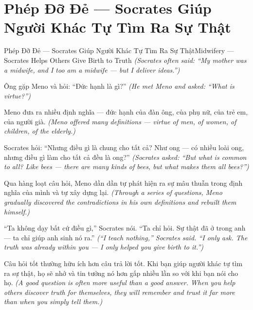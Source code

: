 \section{Phép Đỡ Đẻ — Socrates Giúp Người Khác Tự Tìm Ra Sự Thật}
\begin{truyen}{Phép Đỡ Đẻ — Socrates Giúp Người Khác Tự Tìm Ra Sự Thật}{Midwifery — Socrates Helps Others Give Birth to Truth}
\textit{(Socrates often said: ``My mother was a midwife, and I too am a midwife — but I deliver ideas.'')}

Ông gặp Meno và hỏi: ``Đức hạnh là gì?''
\textit{(He met Meno and asked: ``What is virtue?'')}

Meno đưa ra nhiều định nghĩa — đức hạnh của đàn ông, của phụ nữ, của trẻ em, của người già.
\textit{(Meno offered many definitions — virtue of men, of women, of children, of the elderly.)}

Socrates hỏi: ``Nhưng điều gì là chung cho tất cả? Như ong — có nhiều loài ong, nhưng điều gì làm cho tất cả đều là ong?''
\textit{(Socrates asked: ``But what is common to all? Like bees — there are many kinds of bees, but what makes them all bees?'')}

Qua hàng loạt câu hỏi, Meno dần dần tự phát hiện ra sự mâu thuẫn trong định nghĩa của mình và tự xây dựng lại.
\textit{(Through a series of questions, Meno gradually discovered the contradictions in his own definitions and rebuilt them himself.)}

``Ta không dạy bất cứ điều gì,'' Socrates nói. ``Ta chỉ hỏi. Sự thật đã ở trong anh — ta chỉ giúp anh sinh nó ra.''
\textit{(``I teach nothing,'' Socrates said. ``I only ask. The truth was already within you — I only helped you give birth to it.'')}

\end{truyen}

\begin{baihoc}
Câu hỏi tốt thường hữu ích hơn câu trả lời tốt. Khi bạn giúp người khác tự tìm ra sự thật, họ sẽ nhớ và tin tưởng nó hơn gấp nhiều lần so với khi bạn nói cho họ.
\textit{(A good question is often more useful than a good answer. When you help others discover truth for themselves, they will remember and trust it far more than when you simply tell them.)}
\end{baihoc}
\ngancach

